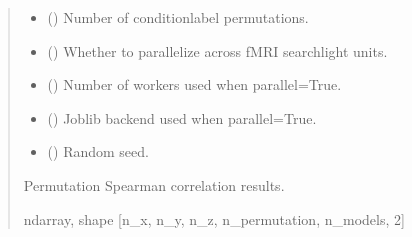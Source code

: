 \documentclass[letterpaper,10pt,english]{sphinxhowto}
\begin{document}
\begin{fulllineitems}
\begin{quote}
\begin{description}
\begin{itemize}
\item {} 
\sphinxAtStartPar
{} (\sphinxstyleliteralemphasis{\sphinxupquote{, }}) \textendash{} Number of condition\sphinxhyphen{}label permutations.

\item {} 
\sphinxAtStartPar
{} (\sphinxstyleliteralemphasis{\sphinxupquote{, }}) \textendash{} Whether to parallelize across fMRI searchlight units.

\item {} 
\sphinxAtStartPar
{} (\sphinxstyleliteralemphasis{\sphinxupquote{, }}) \textendash{} Number of workers used when parallel=True.

\item {} 
\sphinxAtStartPar
{} (\sphinxstyleliteralemphasis{\sphinxupquote{, }}\sphinxstyleliteralemphasis{\sphinxupquote{, }}) \textendash{} Joblib backend used when parallel=True.

\item {} 
\sphinxAtStartPar
{} (\sphinxstyleliteralemphasis{\sphinxupquote{, }}) \textendash{} Random seed.

\end{itemize}

\sphinxAtStartPar
{} \textendash{} Permutation Spearman correlation results.

\sphinxAtStartPar
ndarray, shape {[}n\_x, n\_y, n\_z, n\_permutation, n\_models, 2{]}

\end{description}\end{quote}

\end{fulllineitems}
\end{document}
